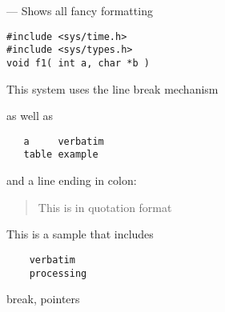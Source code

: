 \startmanpage
{}
--- Shows all fancy formatting 
\startvb\begin{verbatim}
#include <sys/time.h> 
#include <sys/types.h> 
void f1( int a, char *b )
\end{verbatim}
\endvb

\par
{}
\par
{}
This system uses the line
\nextline
break mechanism
\nextline
\par
as well as
\begin{verbatim}
   a     verbatim
   table example
\end{verbatim}

and a line ending in colon:
\par
\begin{quotation}\noindent
This is in quotation format
\end{quotation}
\par
\par
{}
This is a sample that includes
\begin{verbatim}
    verbatim 
    processing
\end{verbatim}

\par
{}
break, pointers
\nextline
{}
\endmanpage

